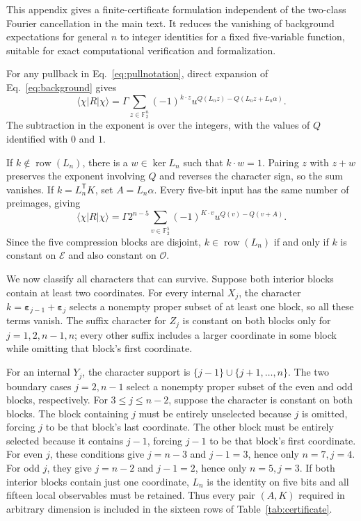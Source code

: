 \documentclass[11pt,a4paper]{article}
\numberwithin{equation}{section}
\theoremstyle{definition}
\newcommand{\F}{\mathbb F}
\newcommand{\ket}[1]{\lvert#1\rangle}
\newcommand{\bra}[1]{\langle#1\rvert}
\newcommand{\E}{\mathcal E}
\newcommand{\Oset}{\mathcal O}
\newcommand{\eps}{\bm\varepsilon}
\begin{document}
This appendix gives a finite-certificate formulation independent of the two-class Fourier cancellation in the main text. It reduces the vanishing of background expectations for general $n$ to integer identities for a fixed five-variable function, suitable for exact computational verification and formalization.

For any pullback in Eq.~\eqref{eq:pullnotation}, direct expansion of Eq.~\eqref{eq:background} gives
\begin{equation}
 \bra\chi R\ket\chi
 =\Gamma\sum_{z\in\F_2^n}(-1)^{k\cdot z}
 u^{Q(L_nz)-Q(L_nz+L_n\alpha)}.
 \label{eq:general-character}
\end{equation}
The subtraction in the exponent is over the integers, with the values of $Q$ identified with $0$ and $1$.

If $k\notin\operatorname{row}(L_n)$, there is a $w\in\ker L_n$ such that $k\cdot w=1$. Pairing $z$ with $z+w$ preserves the exponent involving $Q$ and reverses the character sign, so the sum vanishes. If $k=L_n^{\mathsf T}K$, set $A=L_n\alpha$. Every five-bit input has the same number of preimages, giving
\begin{equation}
 \bra\chi R\ket\chi
 =\Gamma2^{n-5}\sum_{v\in\F_2^5}(-1)^{K\cdot v}
             u^{Q(v)-Q(v+A)}.
 \label{eq:finite-character}
\end{equation}
Since the five compression blocks are disjoint, $k\in\operatorname{row}(L_n)$ if and only if $k$ is constant on $\E$ and also constant on $\Oset$.

We now classify all characters that can survive. Suppose both interior blocks contain at least two coordinates. For every internal $X_j$, the character $k=\eps_{j-1}+\eps_j$ selects a nonempty proper subset of at least one block, so all these terms vanish. The suffix character for $Z_j$ is constant on both blocks only for $j=1,2,n-1,n$; every other suffix includes a larger coordinate in some block while omitting that block's first coordinate.

For an internal $Y_j$, the character support is $\{j-1\}\cup\{j+1,\ldots,n\}$. The two boundary cases $j=2,n-1$ select a nonempty proper subset of the even and odd blocks, respectively. For $3\leq j\leq n-2$, suppose the character is constant on both blocks. The block containing $j$ must be entirely unselected because $j$ is omitted, forcing $j$ to be that block's last coordinate. The other block must be entirely selected because it contains $j-1$, forcing $j-1$ to be that block's first coordinate. For even $j$, these conditions give $j=n-3$ and $j-1=3$, hence only $n=7,j=4$. For odd $j$, they give $j=n-2$ and $j-1=2$, hence only $n=5,j=3$. If both interior blocks contain just one coordinate, $L_n$ is the identity on five bits and all fifteen local observables must be retained. Thus every pair $(A,K)$ required in arbitrary dimension is included in the sixteen rows of Table~\ref{tab:certificate}.
\end{document}
